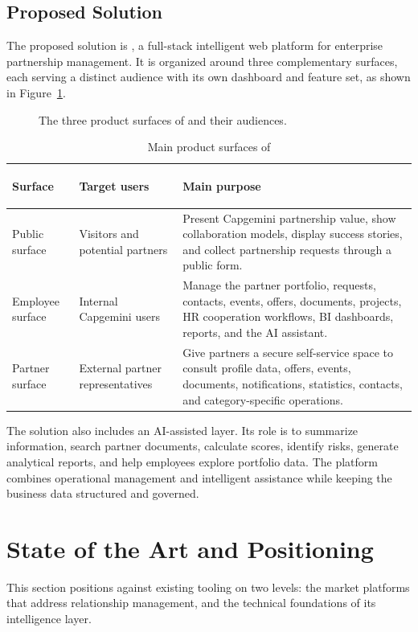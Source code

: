 \subsection{Proposed Solution}
The proposed solution is \projectname{}, a full-stack intelligent web platform for enterprise partnership management. It is organized around three complementary surfaces, each serving a distinct audience with its own dashboard and feature set, as shown in Figure~\ref{fig:surfaces}.
\begin{figure}[htbp]
  \centering
  \caption{The three product surfaces of \projectname{} and their audiences.}
  \label{fig:surfaces}
\end{figure}
\begin{table}[H]
  \centering
  \caption{Main product surfaces of \projectname{}}
  \begin{tabularx}{\textwidth}{>{\bfseries\raggedright\arraybackslash}p{3.2cm}>{\raggedright\arraybackslash}p{3.5cm}X}
    \toprule
    Surface & Target users & Main purpose \\
    \midrule
    Public surface & Visitors and potential partners & Present Capgemini partnership value, show collaboration models, display success stories, and collect partnership requests through a public form. \\
    Employee surface & Internal Capgemini users & Manage the partner portfolio, requests, contacts, events, offers, documents, projects, HR cooperation workflows, BI dashboards, reports, and the AI assistant. \\
    Partner surface & External partner representatives & Give partners a secure self-service space to consult profile data, offers, events, documents, notifications, statistics, contacts, and category-specific operations. \\
    \bottomrule
  \end{tabularx}
\end{table}
The solution also includes an AI-assisted layer. Its role is to summarize information, search partner documents, calculate scores, identify risks, generate analytical reports, and help employees explore portfolio data. The platform combines operational management and intelligent assistance while keeping the business data structured and governed.
\section{State of the Art and Positioning}
\label{sec:chapter1-state-of-the-art}
This section positions \projectname{} against existing tooling on two levels: the market platforms that address relationship management, and the technical foundations of its intelligence layer.
